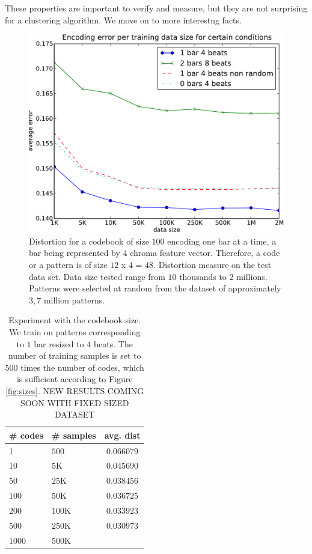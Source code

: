 \documentclass{article}
\begin{document}
These properties are important to verify and measure, but they are not
surprising for a clustering algorithm. We move on to more interestng facts.

\begin{figure}[htb]
\begin{center}
\includegraphics[width=.99\columnwidth]{data_sizes}
\end{center}
\caption{\small{Distortion for a codebook of size $100$ encoding one bar
at a time, a bar being represented by $4$ chroma feature vector.
Therefore, a code or a pattern is of size $12$ x $4$ = $48$.
Distortion measure on the test data set. Data size tested range
from $10$ thousands to $2$ millions. Patterns were selected at
random from the dataset of approximately $3,7$ million patterns.}}
\label{fig:data_sizes}
\end{figure}

\begin{table}
\begin{center}
\begin{tabular}{|l|l|c|}
\hline
\# codes & \# samples & avg. dist \\ \hline \hline
1 & $500$ & $0.066079$ \\
10 & $5$K & $0.045690$ \\
50 & $25$K & $0.038456$ \\
100 & $50$K & $0.036725$ \\
200 & $100$K & $0.033923$ \\
500 & $250$K & $0.030973$ \\
1000 & $500$K & \\ \hline
\end{tabular}
\end{center}
\caption{\small{Experiment with the codebook size. We train on patterns
corresponding to $1$ bar resized to $4$ beats. The number of training
samples is set to $500$ times the number of codes, which is sufficient
according to Figure \ref{fig:sizes}. NEW RESULTS COMING SOON WITH FIXED 
SIZED DATASET }}
\label{tab:cbsize}
\end{table}
\end{document}

